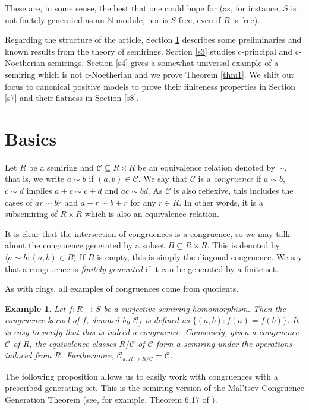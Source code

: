 \documentclass[notitlepage, 10pt]{article}
\theoremstyle{defin}
\newtheorem{eg}{Example}[section]
\theoremstyle{theo}
\theoremstyle{rema}
\newcommand{\N}{\mathbb{N}}
\newcommand{\cC}{\mathcal{C}}
\begin{document}
These are, in some sense, the best that one could hope for (as, for instance, $S$ is not finitely generated as an $\N$-module, nor is $S$ free, even if $R$ is free).

Regarding the structure of the article, Section \ref{s2} describes some preliminaries and known results from the theory of semirings. Section \ref{s3} studies c-principal and c-Noetherian semirings. Section \ref{s4} gives a somewhat universal example of a semiring which is not c-Noetherian and we prove Theorem \ref{thm1}. We shift our focus to canonical positive models to prove their finiteness properties in Section \ref{s7} and their flatness in Section \ref{s8}.

\section{Basics} \label{s2}

Let $R$ be a semiring and $\cC\subseteq R\times R$ be an equivalence relation denoted by $\sim$, that is, we write $a\sim b$ if $(a,b)\in \cC$. We say that $\cC$ is a \textit{congruence} if $a\sim b$, $c\sim d$ implies $a+c \sim c+d$ and $ac \sim bd$. As $\cC$ is also reflexive, this includes the cases of $ar\sim br$ and $a+r\sim b+r$ for any $r\in R$. In other words, it is a subsemiring of $R\times R$ which is also an equivalence relation. 

It is clear that the intersection of congruences is a congruence, so we may talk about the congruence generated by a subset $B\subseteq R\times R$. This is denoted by $\langle a\sim b : (a,b)\in B \rangle$ If $B$ is empty, this is simply the diagonal congruence. We say that a congruence is \textit{finitely generated} if it can be generated by a finite set.

As with rings, all examples of congruences come from quotients.

\begin{eg}
    Let $f : R \to S$ be a surjective semiring homomorphism. Then the \textit{congruence kernel of $f$}, denoted by $\cC_f$ is defined as $\{(a,b) : f(a)=f(b)\}$. It is easy to verify that this is indeed a congruence. Conversely, given a congruence $\cC$ of $R$, the equivalence classes $R/\cC$ of $\cC$ form a semiring under the operations induced from $R$. Furthermore, $\cC_{\pi : R \to R/\cC} = \cC$.
\end{eg}

The following proposition allows us to easily work with congruences with a prescribed generating set. This is the semiring version of the Mal'tsev Congruence Generation Theorem (see, for example, Theorem 6.17 of \cite{FreeseMcKenzieMcNultyTaylor2022}).
\end{document}
